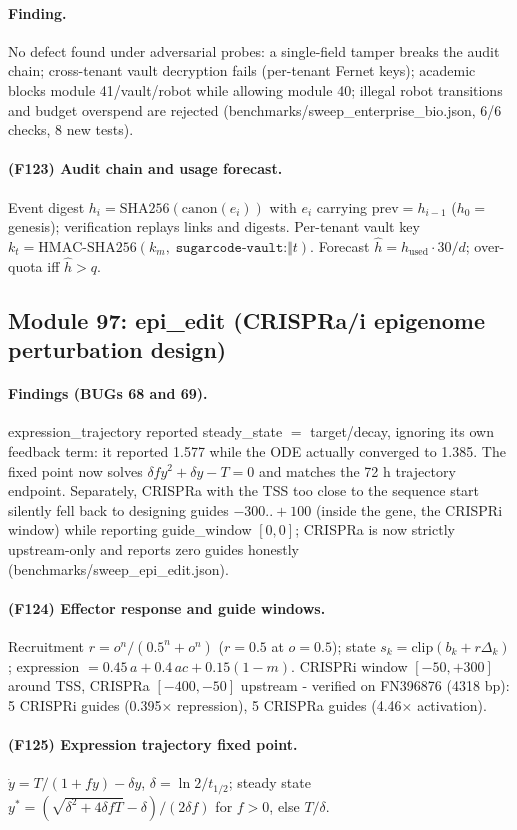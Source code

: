 \paragraph{Finding.} No defect found under adversarial probes: a single-field tamper breaks the audit chain; cross-tenant vault decryption fails (per-tenant Fernet keys); academic blocks module 41/vault/robot while allowing module 40; illegal robot transitions and budget overspend are rejected (benchmarks/sweep\_enterprise\_bio.json, 6/6 checks, 8 new tests).
\paragraph{(F123) Audit chain and usage forecast.} Event digest $h_i=\mathrm{SHA256}(\mathrm{canon}(e_i))$ with $e_i$ carrying $\mathrm{prev}=h_{i-1}$ ($h_0=$ genesis); verification replays links and digests. Per-tenant vault key $k_t=\mathrm{HMAC\mbox{-}SHA256}(k_m,\;\texttt{sugarcode-vault:}\Vert t)$. Forecast $\hat h = h_{\mathrm{used}}\cdot 30/d$; over-quota iff $\hat h>q$.
\subsection{Module 97: epi\_edit (CRISPRa/i epigenome perturbation design)}
\paragraph{Findings (BUGs 68 and 69).} expression\_trajectory reported steady\_state $=$ target/decay, ignoring its own feedback term: it reported 1.577 while the ODE actually converged to 1.385. The fixed point now solves $\delta f y^2+\delta y-T=0$ and matches the 72 h trajectory endpoint. Separately, CRISPRa with the TSS too close to the sequence start silently fell back to designing guides $-300..+100$ (inside the gene, the CRISPRi window) while reporting guide\_window $[0,0]$; CRISPRa is now strictly upstream-only and reports zero guides honestly (benchmarks/sweep\_epi\_edit.json).
\paragraph{(F124) Effector response and guide windows.} Recruitment $r=o^n/(0.5^n+o^n)$ ($r=0.5$ at $o=0.5$); state $s_k=\mathrm{clip}(b_k+r\Delta_k)$; expression $=0.45\,a+0.4\,ac+0.15(1-m)$. CRISPRi window $[-50,+300]$ around TSS, CRISPRa $[-400,-50]$ upstream - verified on FN396876 (4318 bp): 5 CRISPRi guides (0.395$\times$ repression), 5 CRISPRa guides (4.46$\times$ activation).
\paragraph{(F125) Expression trajectory fixed point.} $\dot y = T/(1+fy)-\delta y$, $\delta=\ln2/t_{1/2}$; steady state $y^\ast=(\sqrt{\delta^2+4\delta f T}-\delta)/(2\delta f)$ for $f>0$, else $T/\delta$.
